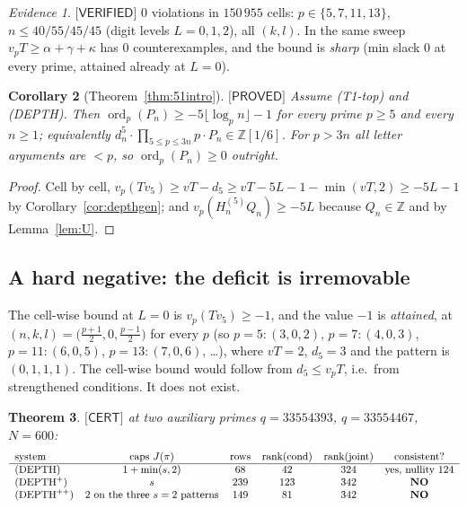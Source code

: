 \documentclass[11pt,reqno]{amsart}
\theoremstyle{plain}
\newtheorem{theorem}{Theorem}[section]
\newtheorem{corollary}[theorem]{Corollary}
\theoremstyle{definition}
\theoremstyle{remark}
\newtheorem{evidence}[theorem]{Evidence}
\numberwithin{equation}{section}
\newcommand{\ZZ}{\mathbb{Z}}
\newcommand{\ord}{\operatorname{ord}}
\newcommand{\rank}{\operatorname{rank}}
\newcommand{\vfive}{v_5}
\newcommand{\PROVED}{\textsf{[PROVED]}}
\newcommand{\VERIFIED}{\textsf{[VERIFIED]}}
\newcommand{\CERT}{\textsf{[CERT]}}
\begin{document}
\begin{evidence}\label{ev:depthgen}
$\VERIFIED$ $0$ violations in $150\,955$ cells: $p\in\{5,7,11,13\}$, $n\le40/55/45/45$ (digit
levels $L=0,1,2$), all $(k,l)$. In the same sweep $v_pT\ge\alpha+\gamma+\kappa$ has $0$
counterexamples, and the bound is \emph{sharp} (min slack $0$ at every prime, attained already
at $L=0$).
\end{evidence}

\begin{corollary}[Theorem~\ref{thm:51intro}]\label{cor:51}
$\PROVED$ Assume \textup{(T1-top)} and \textup{(DEPTH)}. Then
$\ord_p(P_n)\ge-5\lfloor\log_pn\rfloor-1$ for every prime $p\ge5$ and every $n\ge1$;
equivalently $d_n^5\cdot\prod_{5\le p\le3n}p\cdot P_n\in\ZZ[1/6]$. For $p>3n$ all letter
arguments are $<p$, so $\ord_p(P_n)\ge0$ outright.
\end{corollary}

\begin{proof}
Cell by cell, $v_p(T\vfive)\ge vT-d_5\ge vT-5L-1-\min(vT,2)\ge-5L-1$ by
Corollary~\ref{cor:depthgen}; and $v_p(H^{(5)}_nQ_n)\ge-5L$ because $Q_n\in\ZZ$ and by
Lemma~\ref{lem:U}.
\end{proof}

\subsection{A hard negative: the deficit is irremovable}\label{sec:hardneg}

The cell-wise bound at $L=0$ is $v_p(T\vfive)\ge-1$, and the value $-1$ is \emph{attained}, at
$(n,k,l)=\bigl(\tfrac{p+1}{2},0,\tfrac{p-1}{2}\bigr)$ for every $p$ (so $p=5:(3,0,2)$,
$p=7:(4,0,3)$, $p=11:(6,0,5)$, $p=13:(7,0,6)$, \dots), where $vT=2$, $d_5=3$ and the pattern is
$(0,1,1,1)$. The cell-wise bound would follow from $d_5\le v_pT$, i.e.\ from strengthened
conditions. It does not exist.

\begin{theorem}\label{thm:DEPTHplus}
$\CERT$ at two auxiliary primes $q=33554393$, $q=33554467$, $N=600$:
\[
\small
\begin{array}{lccccc}
\text{system} & \text{caps }J(\pi) & \text{rows} & \rank(\text{cond}) & \rank(\text{joint}) & \text{consistent?}\\\hline
\text{(DEPTH)} & 1+\min(s,2) & 68 & 42 & 324 & \text{yes, nullity }124\\
(\mathrm{DEPTH}^{+}) & s & 239 & 123 & 342 & \textbf{NO}\\
(\mathrm{DEPTH}^{++}) & 2\text{ on the three }s=2\text{ patterns} & 149 & 81 & 342 & \textbf{NO}
\end{array}
\]
\end{theorem}
\end{document}
